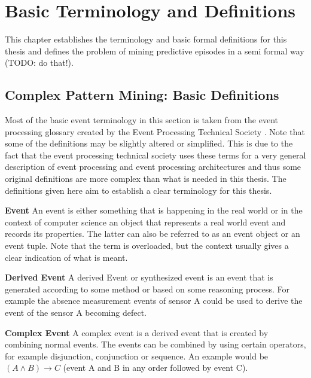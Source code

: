 \chapter{Basic Terminology and Definitions}
\label{chapter_definitions}

\ifpdf
    \graphicspath{{Chapter3/Figs/Raster/}{Chapter3/Figs/PDF/}{Chapter3/Figs/}}
\else
    \graphicspath{{Chapter3/Figs/Vector/}{Chapter3/Figs/}}
\fi

This chapter establishes the terminology and basic formal definitions for this thesis and defines the problem of mining predictive episodes in a semi formal way (TODO: do that!).

\section{Complex Pattern Mining: Basic Definitions}

Most of the basic event terminology in this section is taken from the event processing glossary created by the Event Processing Technical Society \cite{luckham2011epts}. Note that some of the definitions may be slightly altered or simplified. This is due to the fact that the event processing technical society uses these terms for a very general description of event processing and event processing architectures and thus some original definitions are more complex than what is needed in this thesis. The definitions given here aim to establish a clear terminology for this thesis.

\begin{mydef}
\textbf{Event} An event is either something that is happening in the real world or in the context of computer science an object that represents a real world event and records its properties. The latter can also be referred to as an event object or an event tuple. Note that the term is overloaded, but the context usually gives a clear indication of what is meant.
\end{mydef}

\begin{mydef}
\textbf{Derived Event} A derived Event or synthesized event is an event that is generated according to some method or based on some reasoning process. For example the absence measurement events of sensor A could be used to derive the event of the sensor A becoming defect.
\end{mydef}

\begin{mydef}
\textbf{Complex Event} A complex event is a derived event that is created by combining normal events. The events can be combined by using certain operators, for example disjunction, conjunction or sequence. An example would be $(A \land B) \rightarrow C$ (event A and B in any order followed by event C).
\end{mydef}

